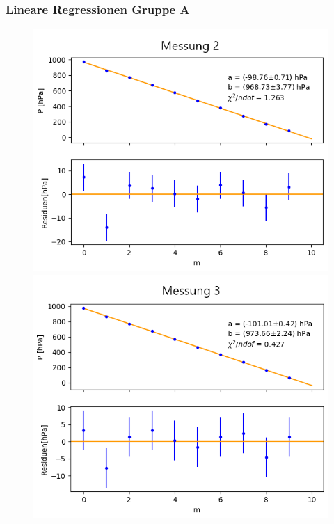 \documentclass[12pt,a4paper]{article}
\begin{document}
\subsubsection{Lineare Regressionen Gruppe A}
\begin{figure}[H]
\centering
\includegraphics[scale=0.5]{Bilder/Druck_A_Var2_2.png}
\includegraphics[scale=0.5]{Bilder/Druck_A_Var2_3.png}

\end{figure}
\end{document}
